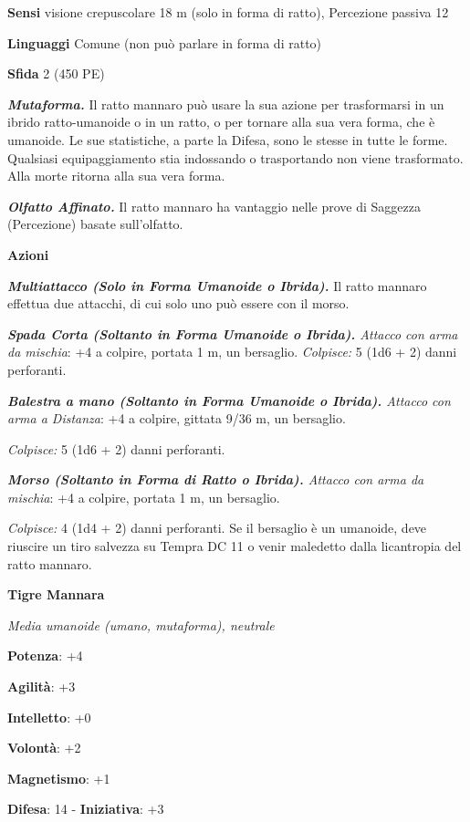 \begin{multicols}{2}
\textbf{Sensi} visione crepuscolare 18 m (solo in forma di ratto), Percezione
passiva 12

\textbf{Linguaggi} Comune (non può parlare in forma di ratto)

\textbf{Sfida} 2 (450 PE)\smallskip

\emph{\textbf{Mutaforma.}} Il ratto mannaro può usare la sua azione per
trasformarsi in un ibrido ratto-umanoide o in un ratto, o per tornare
alla sua vera forma, che è umanoide. Le sue statistiche, a parte la Difesa,
sono le stesse in tutte le forme. Qualsiasi equipaggiamento stia
indossando o trasportando non viene trasformato. Alla morte ritorna alla
sua vera forma.

\emph{\textbf{Olfatto Affinato.}} Il ratto mannaro ha vantaggio nelle
prove di Saggezza (Percezione) basate sull'olfatto.

\smallskip\textbf{Azioni}

\emph{\textbf{Multiattacco (Solo in Forma Umanoide o Ibrida).}} Il ratto
mannaro effettua due attacchi, di cui solo uno può essere con il morso.

\emph{\textbf{Spada Corta (Soltanto in Forma Umanoide o Ibrida).}
Attacco con arma da mischia}: +4 a colpire, portata 1 m, un bersaglio.
\emph{Colpisce:} 5 (1d6 + 2) danni perforanti.

\emph{\textbf{Balestra a mano (Soltanto in Forma Umanoide o Ibrida).}
Attacco con arma a Distanza}: +4 a colpire, gittata 9/36 m, un
bersaglio.

\emph{Colpisce:} 5 (1d6 + 2) danni perforanti.

\emph{\textbf{Morso (Soltanto in Forma di Ratto o Ibrida).} Attacco con
arma da mischia}: +4 a colpire, portata 1 m, un bersaglio.

\emph{Colpisce:} 4 (1d4 + 2) danni perforanti. Se il bersaglio è un
umanoide, deve riuscire un tiro salvezza su Tempra DC 11 o venir
maledetto dalla licantropia del ratto mannaro.



\textbf{Tigre Mannara}

\emph{Media umanoide (umano, mutaforma), neutrale}

\textbf{Potenza}: +4

\textbf{Agilità}: +3

\textbf{Intelletto}: +0

\textbf{Volontà}: +2

\textbf{Magnetismo}: +1

\textbf{Difesa}: 14 - \textbf{Iniziativa}: +3


\end{multicols}
